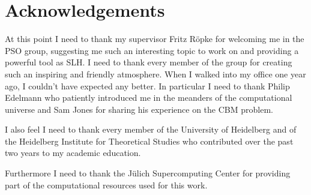 \chapter*{Acknowledgements}
\thispagestyle{empty}
At this point I need to thank my supervisor Fritz Röpke for welcoming me in the PSO group, suggesting me such an interesting topic to work on and providing a powerful tool as SLH. I need to thank every member of the group for creating such an inspiring and friendly atmosphere. When I walked into my office one year ago, I couldn't have expected any better. In particular I need to thank Philip Edelmann who patiently introduced me in the meanders of the computational universe and Sam Jones for sharing his experience on the CBM problem.

I also feel I need to thank every member of the University of Heidelberg and of the Heidelberg Institute for Theoretical Studies who contributed over the past two years to my academic education.

Furthermore I need to thank the Jülich Supercomputing Center for providing part of the computational resources used for this work.

